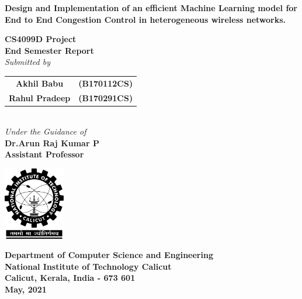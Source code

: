 \documentclass[12pt]{report}
\begin{document}
\begin{titlepage}
\begin{center}
\vspace{1cm}
\large
\textbf{Design and Implementation of an efficient Machine Learning model for End to End Congestion Control in heterogeneous wireless networks.
}
\vspace{0.20cm}

\normalsize
\textbf{CS4099D Project}\\
\textbf{End Semester Report}\\
\vspace{0.65cm}
\emph{Submitted by}\\        
\vspace{0.5cm}
\begin{tabular}{cc}
\textbf{Akhil Babu}&\textbf{(B170112CS)} \\
\textbf{Rahul Pradeep }& \textbf{(B170291CS)}\\
\end{tabular}\\
\vspace{1cm}
\emph{Under the Guidance of}\\
\vspace{1.5cm}
\textbf{Dr.Arun Raj Kumar P\\Assistant Professor}\\
\vspace{0.75cm}
\begin{center}
 \includegraphics[width=0.2\textwidth]{nitc-logo.png}
\end{center}
\vspace{0.5cm}
\textbf{Department of Computer Science and Engineering}\\
\textbf{National Institute of Technology Calicut}\\
\textbf{Calicut, Kerala, India - 673 601}\\
\vspace{0.8cm}
\textbf{May, 2021}
\end{center}
\end{titlepage}
\end{document}
